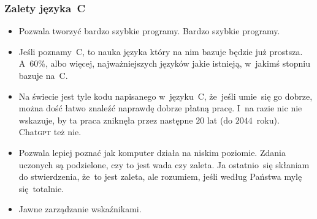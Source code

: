 \documentclass[10pt,t]{beamer}
\begin{document}
\begin{frame}
  \frametitle{Zalety języka~C}


  \begin{itemize}

  \item Pozwala tworzyć bardzo szybkie programy. \alert{Bardzo szybkie}
      programy.

  \item Jeśli poznamy~C, to nauka języka który na nim bazuje będzie
    już prostsza. A~60\%, albo więcej, najważniejszych języków jakie
    istnieją, w~jakimś stopniu bazuje na~C.

  \item Na świecie jest tyle kodu napisanego w~języku~C, że~jeśli umie~się
    go dobrze, można dość łatwo znaleźć naprawdę dobrze płatną pracę. I~na
    razie nic nie wskazuje, by ta praca zniknęła przez następne $20$ lat
    (do $2044$~roku). Chat\textsc{gpt} też nie.

  \item Pozwala lepiej poznać jak komputer działa na niskim poziomie.
    Zdania uczonych są podzielone, czy to jest wada czy zaleta. Ja
    ostatnio~się skłaniam do stwierdzenia, że~to jest zaleta, ale rozumiem,
    jeśli według Państwa mylę się~totalnie.

  \item Jawne zarządzanie wskaźnikami.

  \end{itemize}

\end{frame}
\end{document}
